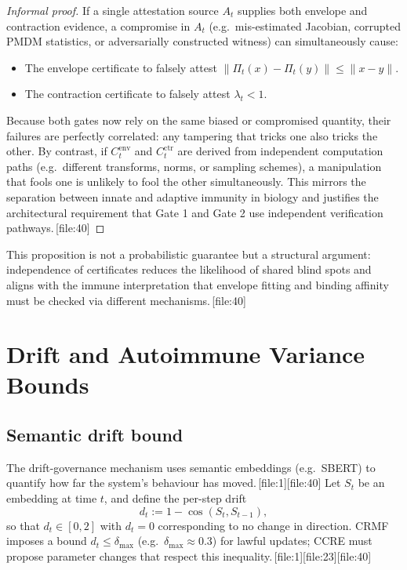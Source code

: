 \documentclass[11pt]{article}
\begin{document}
\begin{proof}[Informal proof]
If a single attestation source \(A_t\) supplies both envelope and contraction evidence, a compromise in \(A_t\) (e.g.\ mis-estimated Jacobian, corrupted PMDM statistics, or adversarially constructed witness) can simultaneously cause:
\begin{itemize}
  \item The envelope certificate to falsely attest \(\|\Pi_t(x)-\Pi_t(y)\|\le\|x-y\|\).
  \item The contraction certificate to falsely attest \(\lambda_t<1\).
\end{itemize}
Because both gates now rely on the same biased or compromised quantity, their failures are perfectly correlated: any tampering that tricks one also tricks the other.
By contrast, if \(C_t^{\mathrm{env}}\) and \(C_t^{\mathrm{ctr}}\) are derived from independent computation paths (e.g.\ different transforms, norms, or sampling schemes), a manipulation that fools one is unlikely to fool the other simultaneously.
This mirrors the separation between innate and adaptive immunity in biology and justifies the architectural requirement that Gate 1 and Gate 2 use independent verification pathways.\,[file:40]
\end{proof}

This proposition is not a probabilistic guarantee but a structural argument: independence of certificates reduces the likelihood of shared blind spots and aligns with the immune interpretation that envelope fitting and binding affinity must be checked via different mechanisms.\,[file:40]

\section{Drift and Autoimmune Variance Bounds}

\subsection{Semantic drift bound}

The drift-governance mechanism uses semantic embeddings (e.g.\ SBERT) to quantify how far the system’s behaviour has moved.\,[file:1][file:40]
Let \(S_t\) be an embedding at time \(t\), and define the per-step drift
\[
d_t := 1 - \cos(S_t, S_{t-1}),
\]
so that \(d_t\in[0,2]\) with \(d_t=0\) corresponding to no change in direction.
CRMF imposes a bound \(d_t\le\delta_{\max}\) (e.g.\ \(\delta_{\max}\approx 0.3\)) for lawful updates; CCRE must propose parameter changes that respect this inequality.\,[file:1][file:23][file:40]
\end{document}

